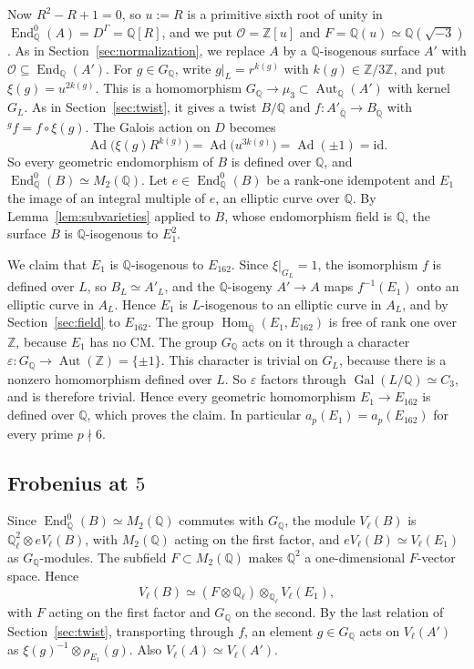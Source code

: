 \documentclass[11pt]{article}
\newcommand{\Q}{\mathbb Q}
\newcommand{\Z}{\mathbb Z}
\DeclareMathOperator{\End}{End}
\DeclareMathOperator{\Gal}{Gal}
\DeclareMathOperator{\Hom}{Hom}
\DeclareMathOperator{\Aut}{Aut}
\DeclareMathOperator{\Ad}{Ad}
\begin{document}
Now \(R^2-R+1=0\), so \(u:=R\) is a primitive sixth root of unity in
\(\End^0_{\Q}(A)=D^\Gamma=\Q[R]\), and we put \(\mathcal O=\Z[u]\) and
\(F=\Q(u)\simeq\Q(\sqrt{-3})\). As in Section~\ref{sec:normalization},
we replace \(A\) by a \(\Q\)-isogenous surface \(A'\) with
\(\mathcal O\subseteq\End_{\Q}(A')\). For \(g\in G_{\Q}\), write
\(g|_L=r^{k(g)}\) with \(k(g)\in\Z/3\Z\), and put \(\xi(g)=u^{2k(g)}\).
This is a homomorphism \(G_{\Q}\to\mu_3\subset\Aut_{\Q}(A')\) with
kernel \(G_L\). As in Section~\ref{sec:twist}, it gives a twist \(B/\Q\)
and \(f:A'_{\overline{\Q}}\to B_{\overline{\Q}}\) with
\({}^gf=f\circ\xi(g)\). The Galois action on \(D\) becomes
\[
 \Ad\bigl(\xi(g)R^{k(g)}\bigr)=\Ad\bigl(u^{3k(g)}\bigr)=\Ad(\pm1)=\mathrm{id}.
\]
So every geometric endomorphism of \(B\) is defined over \(\Q\), and
\(\End^0_{\Q}(B)\simeq M_2(\Q)\). Let \(e\in\End^0_{\Q}(B)\) be a
rank-one idempotent and \(E_1\) the image of an integral multiple of
\(e\), an elliptic curve over \(\Q\). By Lemma~\ref{lem:subvarieties}
applied to \(B\), whose endomorphism field is \(\Q\), the surface \(B\)
is \(\Q\)-isogenous to \(E_1^2\).

We claim that \(E_1\) is \(\Q\)-isogenous to \(E_{162}\). Since
\(\xi|_{G_L}=1\), the isomorphism \(f\) is defined over \(L\), so
\(B_L\simeq A'_L\), and the \(\Q\)-isogeny \(A'\to A\) maps
\(f^{-1}(E_1)\) onto an elliptic curve in \(A_L\). Hence \(E_1\) is
\(L\)-isogenous to an elliptic curve in \(A_L\), and by
Section~\ref{sec:field} to \(E_{162}\). The group
\(\Hom_{\overline{\Q}}(E_1,E_{162})\) is free of rank one over \(\Z\),
because \(E_1\) has no CM. The group \(G_{\Q}\) acts on it through a
character \(\varepsilon:G_{\Q}\to\Aut(\Z)=\{\pm1\}\). This character is
trivial on \(G_L\), because there is a nonzero homomorphism defined over
\(L\). So \(\varepsilon\) factors through \(\Gal(L/\Q)\simeq C_3\), and
is therefore trivial. Hence every geometric homomorphism
\(E_1\to E_{162}\) is defined over \(\Q\), which proves the claim. In
particular \(a_p(E_1)=a_p(E_{162})\) for every prime \(p\nmid6\).

\subsection{Frobenius at \texorpdfstring{\(5\)}{5}}\label{sec:frobenius}

Since \(\End^0_{\Q}(B)\simeq M_2(\Q)\) commutes with \(G_{\Q}\), the
module \(V_\ell(B)\) is \(\Q_\ell^2\otimes eV_\ell(B)\), with
\(M_2(\Q)\) acting on the first factor, and
\(eV_\ell(B)\simeq V_\ell(E_1)\) as \(G_{\Q}\)-modules. The subfield
\(F\subset M_2(\Q)\) makes \(\Q^2\) a one-dimensional \(F\)-vector
space. Hence
\[
 V_\ell(B)\simeq(F\otimes\Q_\ell)\otimes_{\Q_\ell}V_\ell(E_1),
\]
with \(F\) acting on the first factor and \(G_{\Q}\) on the second. By
the last relation of Section~\ref{sec:twist}, transporting through \(f\),
an element \(g\in G_{\Q}\) acts on \(V_\ell(A')\) as
\(\xi(g)^{-1}\otimes\rho_{E_1}(g)\). Also \(V_\ell(A)\simeq V_\ell(A')\).
\end{document}
